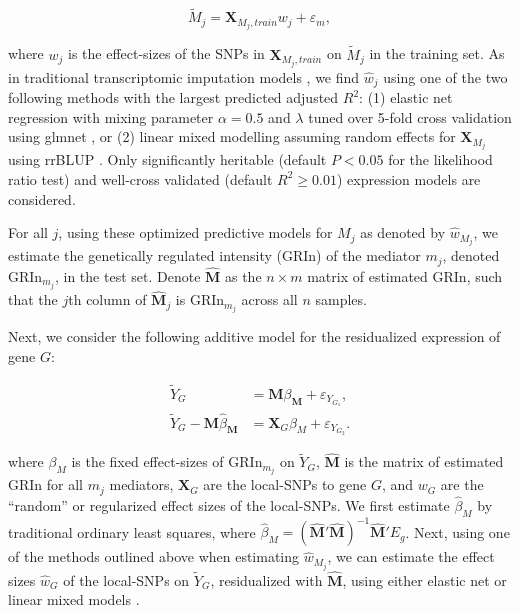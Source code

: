 \begin{equation}
	\tilde{M}_j = \mathbf{X}_{M_j,train}w_j +
	\varepsilon_m,
\end{equation}

\noindent where $w_j$ is the effect-sizes of
the SNPs in $\mathbf{X}_{M_j,train}$ on $\tilde{M}_j$
in the training set.
As in traditional transcriptomic
imputation models \cite{Gamazon2015,Gusev2016},
we find $\hat{w}_j$ using
one of the two following methods
with the largest predicted adjusted $R^2$: 
(1) elastic net regression with mixing parameter $\alpha = 0.5$
and $\lambda$ tuned over 5-fold cross validation
using glmnet \cite{Friedman2010}, or
(2) linear mixed modelling assuming random effects
for $\mathbf{X}_{M_j}$ using rrBLUP \cite{Endelman2011}.
Only significantly heritable (default $P < 0.05$
for the likelihood ratio test) \cite{Yang2015} and
well-cross validated (default $R^2 \geq 0.01$)
expression models
are considered.

For all $j$, using these optimized predictive
models for $M_j$ as denoted
by $\hat{w}_{M_j}$, 
we estimate the genetically regulated
intensity (GRIn) of the mediator $m_j$, denoted
GRIn$_{m_j}$, in the test set. Denote
$\mathbf{\hat{M}}$ as the $n \times m$
matrix of estimated GRIn, such that
the $j$th column of $\mathbf{\hat{M}}_j$ is
GRIn$_{m_j}$ across all $n$ samples. 

Next, we consider
the following additive model for
the residualized expression of gene $G$:


\begin{equation}\label{2sls}
\begin{split}
\tilde{Y}_G & = \mathbf{M}\beta_{\mathbf{M}} + \varepsilon_{Y_{G_1}}, \\
\tilde{Y}_G - \mathbf{M}\hat{\beta}_{\mathbf{M}} & = \mathbf{X}_G\beta_{M} + \varepsilon_{Y_{G_2}}.
\end{split}
\end{equation}

\noindent where $\beta_M$ is the fixed effect-sizes
of GRIn$_{m_j}$ on $\tilde{Y}_G$, $\hat{\mathbf{M}}$
is the matrix of estimated GRIn for
all $m_j$ mediators, $\mathbf{X}_G$
are the local-SNPs to gene $G$, and $w_G$
are the ``random'' or regularized 
effect sizes of the local-SNPs.
We first estimate $\hat{\beta}_M$ by
traditional ordinary least squares, where
$\hat{\beta}_M = \left(\mathbf{\hat{M}}'\mathbf{\hat{M}}\right)^{-1}\mathbf{\hat{M}}'E_g$.
Next, using one of the methods outlined above
when estimating $\hat{w}_{M_j}$, we
can estimate the effect sizes $\hat{w}_G$ 
of the local-SNPs on $\tilde{Y}_G$, residualized
with $\hat{\mathbf{M}}$, using
either elastic net or linear mixed models \cite{Friedman2010,Endelman2011}. 

